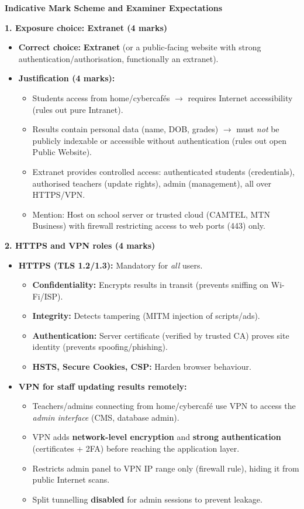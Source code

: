 \documentclass[11pt]{article}
\begin{document}
\begin{corrige}
\textbf{Indicative Mark Scheme and Examiner Expectations}

\textbf{1. Exposure choice: Extranet (4 marks)}
\begin{itemize}
\item \textbf{Correct choice:} \textbf{Extranet} (or a public-facing website with strong authentication/authorisation, functionally an extranet).
\item \textbf{Justification (4 marks):}
\begin{itemize}
\item Students access from home/cybercafés $\rightarrow$ requires Internet accessibility (rules out pure Intranet).
\item Results contain personal data (name, DOB, grades) $\rightarrow$ must \emph{not} be publicly indexable or accessible without authentication (rules out open Public Website).
\item Extranet provides controlled access: authenticated students (credentials), authorised teachers (update rights), admin (management), all over HTTPS/VPN.
\item Mention: Host on school server or trusted cloud (CAMTEL, MTN Business) with firewall restricting access to web ports (443) only.
\end{itemize}
\end{itemize}

\textbf{2. HTTPS and VPN roles (4 marks)}
\begin{itemize}
\item \textbf{HTTPS (TLS 1.2/1.3):} Mandatory for \emph{all} users.
\begin{itemize}
\item \textbf{Confidentiality:} Encrypts results in transit (prevents sniffing on Wi-Fi/ISP).
\item \textbf{Integrity:} Detects tampering (MITM injection of scripts/ads).
\item \textbf{Authentication:} Server certificate (verified by trusted CA) proves site identity (prevents spoofing/phishing).
\item \textbf{HSTS, Secure Cookies, CSP:} Harden browser behaviour.
\end{itemize}
\item \textbf{VPN for staff updating results remotely:}
\begin{itemize}
\item Teachers/admins connecting from home/cybercafé use VPN to access the \emph{admin interface} (CMS, database admin).
\item VPN adds \textbf{network-level encryption} and \textbf{strong authentication} (certificates + 2FA) before reaching the application layer.
\item Restricts admin panel to VPN IP range only (firewall rule), hiding it from public Internet scans.
\item Split tunnelling \textbf{disabled} for admin sessions to prevent leakage.
\end{itemize}
\end{itemize}


\end{corrige}
\end{document}
